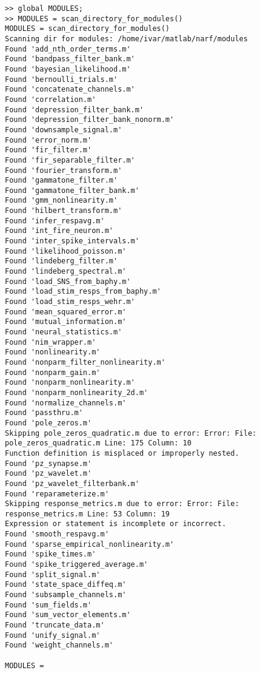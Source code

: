 \documentclass[letterpaper]{report}
\begin{document}
\begin{verbatim}
>> global MODULES;
>> MODULES = scan_directory_for_modules()
MODULES = scan_directory_for_modules()
Scanning dir for modules: /home/ivar/matlab/narf/modules
Found 'add_nth_order_terms.m'
Found 'bandpass_filter_bank.m'
Found 'bayesian_likelihood.m'
Found 'bernoulli_trials.m'
Found 'concatenate_channels.m'
Found 'correlation.m'
Found 'depression_filter_bank.m'
Found 'depression_filter_bank_nonorm.m'
Found 'downsample_signal.m'
Found 'error_norm.m'
Found 'fir_filter.m'
Found 'fir_separable_filter.m'
Found 'fourier_transform.m'
Found 'gammatone_filter.m'
Found 'gammatone_filter_bank.m'
Found 'gmm_nonlinearity.m'
Found 'hilbert_transform.m'
Found 'infer_respavg.m'
Found 'int_fire_neuron.m'
Found 'inter_spike_intervals.m'
Found 'likelihood_poisson.m'
Found 'lindeberg_filter.m'
Found 'lindeberg_spectral.m'
Found 'load_SNS_from_baphy.m'
Found 'load_stim_resps_from_baphy.m'
Found 'load_stim_resps_wehr.m'
Found 'mean_squared_error.m'
Found 'mutual_information.m'
Found 'neural_statistics.m'
Found 'nim_wrapper.m'
Found 'nonlinearity.m'
Found 'nonparm_filter_nonlinearity.m'
Found 'nonparm_gain.m'
Found 'nonparm_nonlinearity.m'
Found 'nonparm_nonlinearity_2d.m'
Found 'normalize_channels.m'
Found 'passthru.m'
Found 'pole_zeros.m'
Skipping pole_zeros_quadratic.m due to error: Error: File: pole_zeros_quadratic.m Line: 175 Column: 10
Function definition is misplaced or improperly nested.
Found 'pz_synapse.m'
Found 'pz_wavelet.m'
Found 'pz_wavelet_filterbank.m'
Found 'reparameterize.m'
Skipping response_metrics.m due to error: Error: File: response_metrics.m Line: 53 Column: 19
Expression or statement is incomplete or incorrect.
Found 'smooth_respavg.m'
Found 'sparse_empirical_nonlinearity.m'
Found 'spike_times.m'
Found 'spike_triggered_average.m'
Found 'split_signal.m'
Found 'state_space_diffeq.m'
Found 'subsample_channels.m'
Found 'sum_fields.m'
Found 'sum_vector_elements.m'
Found 'truncate_data.m'
Found 'unify_signal.m'
Found 'weight_channels.m'

MODULES = 


\end{verbatim}
\end{document}
